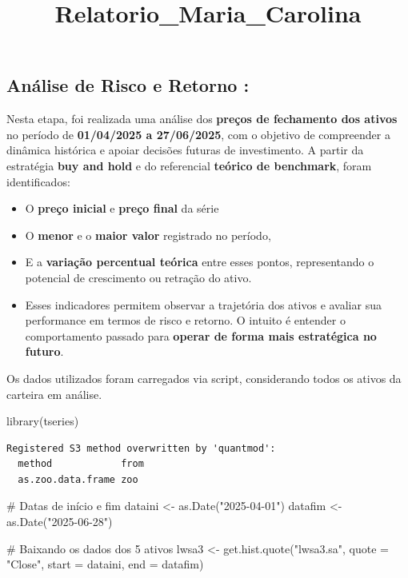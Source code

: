 \documentclass[
  letterpaper,
  DIV=11,
  numbers=noendperiod]{scrartcl}
\title{Relatorio\_Maria\_Carolina}
\author{}
\date{}
\newenvironment{Shaded}{\begin{snugshade}}{\end{snugshade}}
\newcommand{\AttributeTok}[1]{\textcolor[rgb]{0.40,0.45,0.13}{#1}}
\newcommand{\CommentTok}[1]{\textcolor[rgb]{0.37,0.37,0.37}{#1}}
\newcommand{\FunctionTok}[1]{\textcolor[rgb]{0.28,0.35,0.67}{#1}}
\newcommand{\NormalTok}[1]{\textcolor[rgb]{0.00,0.23,0.31}{#1}}
\newcommand{\OtherTok}[1]{\textcolor[rgb]{0.00,0.23,0.31}{#1}}
\newcommand{\StringTok}[1]{\textcolor[rgb]{0.13,0.47,0.30}{#1}}
\begin{document}
\maketitle


\subsection{Análise de Risco e Retorno
:}\label{anuxe1lise-de-risco-e-retorno}

Nesta etapa, foi realizada uma análise dos \textbf{preços de fechamento
dos ativos} no período de \textbf{01/04/2025 a 27/06/2025}, com o
objetivo de compreender a dinâmica histórica e apoiar decisões futuras
de investimento. A partir da estratégia \textbf{buy and hold} e do
referencial \textbf{teórico de benchmark}, foram identificados:

\begin{itemize}
\item
  O \textbf{preço inicial} e \textbf{preço final} da série
\item
  O \textbf{menor} e o \textbf{maior valor} registrado no período,
\item
  E a \textbf{variação percentual teórica} entre esses pontos,
  representando o potencial de crescimento ou retração do ativo.
\item
  Esses indicadores permitem observar a trajetória dos ativos e avaliar
  sua performance em termos de risco e retorno. O intuito é entender o
  comportamento passado para \textbf{operar de forma mais estratégica no
  futuro}.
\end{itemize}

Os dados utilizados foram carregados via script, considerando todos os
ativos da carteira em análise.

\begin{Shaded}
\begin{Highlighting}[]
\FunctionTok{library}\NormalTok{(tseries)}
\end{Highlighting}
\end{Shaded}

\begin{verbatim}
Registered S3 method overwritten by 'quantmod':
  method            from
  as.zoo.data.frame zoo 
\end{verbatim}

\begin{Shaded}
\begin{Highlighting}[]
\CommentTok{\# Datas de início e fim}
\NormalTok{dataini }\OtherTok{\textless{}{-}} \FunctionTok{as.Date}\NormalTok{(}\StringTok{"2025{-}04{-}01"}\NormalTok{)}
\NormalTok{datafim }\OtherTok{\textless{}{-}} \FunctionTok{as.Date}\NormalTok{(}\StringTok{"2025{-}06{-}28"}\NormalTok{)}

\CommentTok{\# Baixando os dados dos 5 ativos}
\NormalTok{lwsa3  }\OtherTok{\textless{}{-}} \FunctionTok{get.hist.quote}\NormalTok{(}\StringTok{"lwsa3.sa"}\NormalTok{,  }\AttributeTok{quote =} \StringTok{"Close"}\NormalTok{, }\AttributeTok{start =}\NormalTok{ dataini, }\AttributeTok{end =}\NormalTok{ datafim)}
\end{Highlighting}
\end{Shaded}
\end{document}
